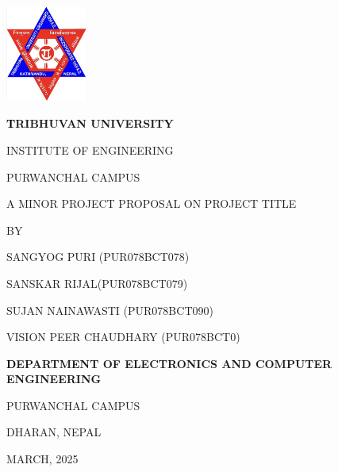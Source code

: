 \begin{titlepage}
    \centering
    
    \includegraphics[width=0.2\textwidth]{Graphics/TULogo.png}\par
    \vspace{1.2cm}
    {\fontsize{14pt}{12pt}\selectfont\bfseries\textcolor{black}
    TRIBHUVAN UNIVERSITY \par INSTITUTE OF ENGINEERING \par PURWANCHAL CAMPUS \par
    \vspace{1.2cm}
    \begin{flushleft}
    
    \end{flushleft}

    \par A MINOR PROJECT PROPOSAL ON PROJECT TITLE \par

    \vspace{1.2cm}
    BY\par SANGYOG PURI (PUR078BCT078)
      \par SANSKAR RIJAL(PUR078BCT079)
      \par SUJAN NAINAWASTI (PUR078BCT090)
      \par VISION PEER CHAUDHARY (PUR078BCT0)
    \par
    \vspace{1.2cm}\par
    }
    {\fontsize{13pt}{12pt}\selectfont\bfseries\textcolor{black}
    DEPARTMENT OF ELECTRONICS AND COMPUTER ENGINEERING\par PURWANCHAL CAMPUS\par DHARAN, NEPAL\par
    \vspace{1.2cm}
    \vspace{1.2cm}
    
    MARCH, 2025 
    }
\end{titlepage}

